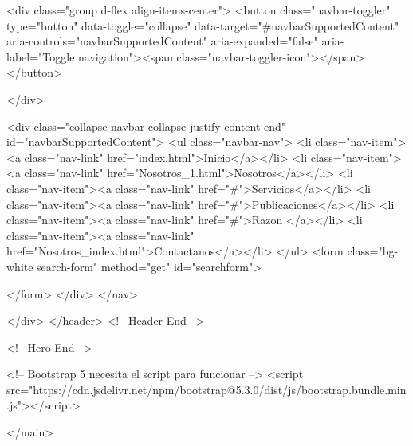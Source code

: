                 
                <div class="group d-flex align-items-center">
                    <button class="navbar-toggler" type="button" data-toggle="collapse"
                        data-target="#navbarSupportedContent" aria-controls="navbarSupportedContent"
                        aria-expanded="false" aria-label="Toggle navigation"><span
                            class="navbar-toggler-icon"></span></button>
                    
                    
                </div>

                
                
                <div class="collapse navbar-collapse justify-content-end" id="navbarSupportedContent">
                    <ul class="navbar-nav">
                        <li class="nav-item"><a class="nav-link" href="index.html">Inicio</a></li>
                        <li class="nav-item"><a class="nav-link" href="Nosotros_1.html">Nosotros</a></li>
                        <li class="nav-item"><a class="nav-link" href="#">Servicios</a></li>
                        <li class="nav-item"><a class="nav-link" href="#">Publicaciones</a></li>
                        <li class="nav-item"><a class="nav-link" href="#">Razon </a></li>
                        <li class="nav-item"><a class="nav-link" href="Nosotros_index.html">Contactanos</a></li>
                    </ul>
                    <form class="bg-white search-form" method="get" id="searchform">
                        
                    </form>
                </div>
            </nav>


        </div>
    </header>
    <!-- Header End -->


 


    <!-- Hero End -->

    




<!-- Bootstrap 5 necesita el script para funcionar -->
<script src="https://cdn.jsdelivr.net/npm/bootstrap@5.3.0/dist/js/bootstrap.bundle.min.js"></script>





 </main>

